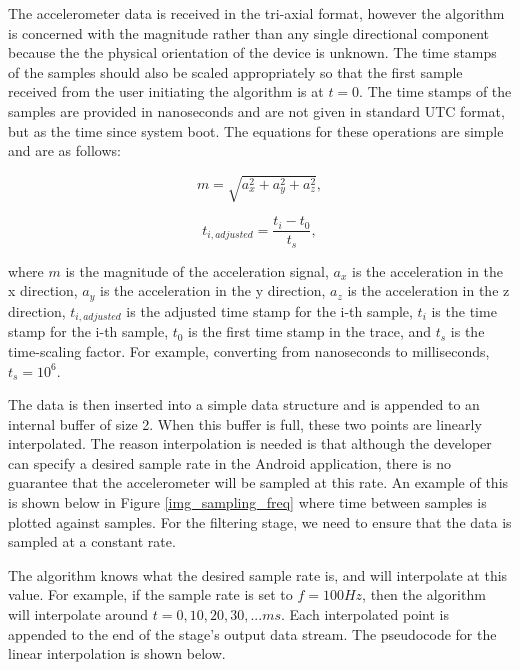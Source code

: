             The accelerometer data is received in the tri-axial format, however the algorithm is concerned with the magnitude rather than any single directional component because the the physical orientation of the device is unknown. The time stamps of the samples should also be scaled appropriately so that the first sample received from the user initiating the algorithm is at $t = 0$. The time stamps of the samples are provided in nanoseconds and are not given in standard UTC format, but as the time since system boot. The equations for these operations are simple and are as follows:

            \begin{equation}
                m = \sqrt{a_{x}^2 + a_{y}^2 + a_{z}^2},
            \end{equation}

            \begin{equation}
                t_{i,adjusted} = \frac{t_i - t_0}{t_s},
            \end{equation}

            where $m$ is the magnitude of the acceleration signal, $a_{x}$ is the acceleration in the x direction, $a_{y}$ is the acceleration in the y direction, $a_{z}$ is the acceleration in the z direction, $t_{i,adjusted}$ is the adjusted time stamp for the i-th sample, $t_i$ is the time stamp for the i-th sample, $t_0$ is the first time stamp in the trace, and $t_s$ is the time-scaling factor. For example, converting from nanoseconds to milliseconds, $t_s = 10^6$. 

            The data is then inserted into a simple data structure and is appended to an internal buffer of size 2. When this buffer is full, these two points are linearly interpolated. The reason interpolation is needed is that although the developer can specify a desired sample rate in the Android application, there is no guarantee that the accelerometer will be sampled at this rate. An example of this is shown below in Figure \ref{img_sampling_freq} where time between samples is plotted against samples. For the filtering stage, we need to ensure that the data is sampled at a constant rate.

            The algorithm knows what the desired sample rate is, and will interpolate at this value. For example, if the sample rate is set to $f = 100 Hz$, then the algorithm will interpolate around $t = 0, 10, 20, 30, ... ms$. Each interpolated point is appended to the end of the stage's output data stream. The pseudocode for the linear interpolation is shown below.


